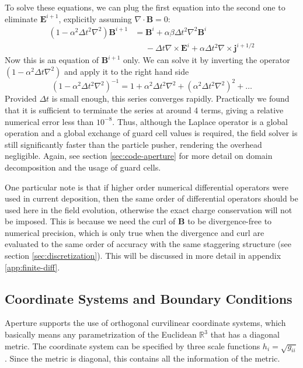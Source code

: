 To solve these equations, we can plug the first equation into the second one
to eliminate $\mathbf{E}^{i+1}$, explicitly assuming $\nabla\cdot \mathbf{B} =
0$:
\begin{equation}
  \begin{split}
    (1 - \alpha^2\Delta t^2\nabla^2)\mathbf{B}^{i+1} &= \mathbf{B}^i + \alpha\beta \Delta t^2\nabla^2 \mathbf{B}^i \\
    &\phantom{=} -\Delta t\nabla\times \mathbf{E}^i + \alpha\Delta t^2\nabla\times \mathbf{j}^{i + 1/2}
  \end{split}
\end{equation}
Now this is an equation of $\mathbf{B}^{i+1}$ only. We can solve it by inverting
the operator $(1 - \alpha^2\Delta t\nabla^2)$ and apply it to the right hand side
\begin{equation}
  \label{eq:field-relax}
  (1 - \alpha^2\Delta t^2\nabla^2)^{-1} = 1 + \alpha^2\Delta t^2\nabla^2 + (\alpha^2\Delta t^2\nabla^2)^2 + \dots
\end{equation}
Provided $\Delta t$ is small enough, this series converges rapidly. Practically
we found that it is sufficient to terminate the series at around 4 terms, giving
a relative numerical error less than $10^{-8}$. Thus, although the Laplace
operator is a global operation and a global exchange of guard cell values is
required, the field solver is still significantly faster than the particle
pusher, rendering the overhead negligible. Again, see section
\ref{sec:code-aperture} for more detail on domain decomposition and the usage of
guard cells.

One particular note is that if higher order numerical differential operators
were used in current deposition, then the same order of differential operators
should be used here in the field evolution, otherwise the exact charge
conservation will not be imposed. This is because we need the curl of
$\mathbf{B}$ to be divergence-free to numerical precision, which is only true
when the divergence and curl are evaluated to the same order of accuracy with
the same staggering structure (see section \ref{sec:discretization}). This will
be discussed in more detail in appendix \ref{app:finite-diff}.

\subsection{Coordinate Systems and Boundary Conditions}
\label{sec:coord-syst-sing}

Aperture supports the use of orthogonal curvilinear coordinate systems, which
basically means any parametrization of the Euclidean $\mathbb{R}^{3}$ that has a
diagonal metric. The coordinate system can be specified by three scale functions
$h_{i} = \sqrt{g_{ii}}$. Since the metric is diagonal, this contains all the
information of the metric.

